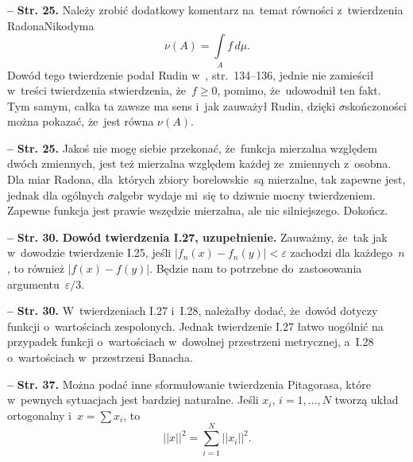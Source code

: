 \documentclass[a4paper,11pt]{article}
\newcommand{\spaceFour}{0.5em}
\newcommand{\ld}{\ldots}
\newcommand{\veps}{\varepsilon}
\newcommand{\si}{\sigma}
\newcommand{\Sum}{\sum\limits}
\newcommand{\Int}{\int\limits}
\newcommand{\IntSet}[3]{\Int_{ #1 } #2 \, d#3} %
\providecommand{\absj}[1]{\lvert #1 \rvert}
\newcommand{\norm}[1]{\left|\left| #1 \right|\right|}
\newcommand{\tb}{\textbf}
\newcommand{\noi}{\noindent}
\newcommand{\start}{\noi \tb{--} {}}
\newcommand{\Str}[1]{\tb{Str. #1.}}
\newcommand{\Dok}{{\color{red} Dokończ.}}
\begin{document}
\vspace{\spaceFour}


\start \Str{25} Należy zrobić dodatkowy komentarz na~temat równości
z~twierdzenia Radona\dywiz Nikodyma
\begin{equation}
  \label{eq:2}
  \nu( A ) = \IntSet{ A }{ f }{ \mu }.
\end{equation}
Dowód tego twierdzenie podał Rudin w~\cite{Rudin98}, str.~134--136,
jednie nie zamieścił w~treści twierdzenia stwierdzenia, że~$f \geq 0$,
pomimo, że~udowodnił ten fakt. Tym samym, całka ta zawsze ma sens
i~jak zauważył Rudin, dzięki $\si$\dywiz skończoności można pokazać,
że~jest równa $\nu( A )$. %

\vspace{\spaceFour}


\start \Str{25} Jakoś nie mogę siebie przekonać, że~funkcja mierzalna
względem dwóch zmiennych, jest też mierzalna względem każdej
ze~zmiennych z~osobna. Dla miar Radona, dla~których zbiory
borelowskie~są mierzalne, tak zapewne jest, jednak dla ogólnych
$\si$\dywiz algebr wydaje mi~się to dziwnie mocny twierdzeniem.
Zapewne funkcja jest prawie wszędzie mierzalna, ale nic silniejszego.
\Dok

\vspace{\spaceFour}


\start \Str{30} \tb{Dowód twierdzenia I.27, uzupełnienie.} Zauważmy,
że~tak jak w~dowodzie twierdzenie I.25, jeśli
$\absj{ f_{ n }( x ) - f_{ n }( y ) } < \veps$ zachodzi dla
każdego~$n$, to również $\absj{ f( x ) - f( y ) }$. Będzie nam to
potrzebne do~zastosowania argumentu~$\veps / 3$. %

\vspace{\spaceFour}


\start \Str{30} W~twierdzeniach I.27 i~I.28, należałby dodać, że~dowód
dotyczy funkcji o~wartościach zespolonych. Jednak twierdzenie I.27
łatwo uogólnić na przypadek funkcji o~wartościach w~dowolnej
przestrzeni metrycznej, a~I.28 o~wartościach w~przestrzeni
Banacha. %

\vspace{\spaceFour}


\start \Str{37} Można podać inne sformułowanie twierdzenia Pitagorasa,
które w~pewnych sytuacjach jest bardziej naturalne. Jeśli $x_{ i }$,
$i = 1, \ld, N$ tworzą układ ortogonalny i~$x = \Sum x_{ i }$, to
\begin{equation*}
  \norm{ x }^{ 2 } = \Sum_{ i = 1 }^{ N } \norm{ x_{ i } }^{ 2 }.
\end{equation*}
\end{document}
